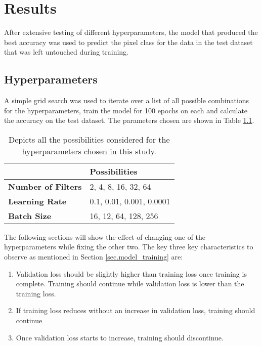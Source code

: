 \chapter{Results}
After extensive testing of different hyperparameters, the model that produced the best accuracy was used to predict the pixel class for the data in the test dataset that was left untouched during training. 
\section{Hyperparameters}
A simple grid search was used to iterate over a list of all possible combinations for the hyperparameters, train the model for 100 epochs on each and calculate the accuracy on the test dataset. The parameters chosen are shown in Table \ref{tab.grid_search}. 
\begin{table}[htbp]
\centering 
\begin{tabular}{l|l}
                           & \textbf{Possibilities}   \\ \hline
\textbf{Number of Filters} & 2, 4, 8, 16, 32, 64      \\ 
\textbf{Learning Rate}     & 0.1, 0.01, 0.001, 0.0001 \\ 
\textbf{Batch Size}        & 16, 12, 64, 128, 256     \\ 
\end{tabular}
\caption[Hyperparameter possibilities]{Depicts all the possibilities considered for the hyperparameters chosen in this study.}
\label{tab.grid_search}
\end{table}
The following sections will show the effect of changing one of the hyperparameters while fixing the other two. The key three key characteristics to observe as mentioned in Section \ref{sec.model_training} are:
\begin{enumerate}
    \item Validation loss should be slightly higher than training loss once training is complete. Training should continue while validation loss is lower than the training loss.
    \item If training loss reduces without an increase in validation loss, training should continue
    \item Once validation loss starts to increase, training should discontinue. 
\end{enumerate}
